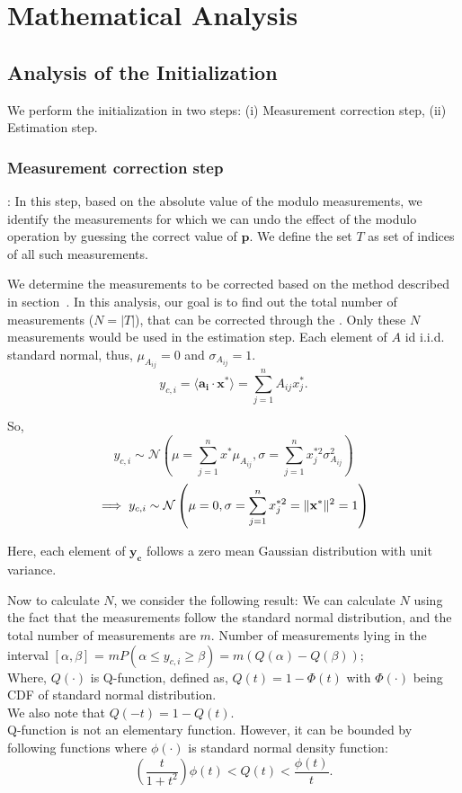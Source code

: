 \newpage

\section{Mathematical Analysis}

\subsection{Analysis of the Initialization}
We perform the initialization in two steps:
(i) Measurement correction step, (ii) Estimation step.

\subsubsection{Measurement correction step}\label{meascorr}: In this step, based on the absolute value of the modulo measurements, we identify the measurements for which we can undo the effect of the modulo operation by guessing the correct value of $\mathbf{p}$. We define the set $T$ as set of indices of all such measurements.

We determine the measurements to be corrected based on the method described in section~{}. 
In this analysis, our goal is to find out the total number of measurements ($N=|T|$), that can be corrected through the . Only these $N$ measurements would be used in the estimation step.
Each element of $A$ id i.i.d. standard normal, thus, $\mu_{A_{ij}} = 0$ and $\sigma_{A_{ij}}=1$.
$$
y_{c,i} =\langle \mathbf{a_i} \cdot \mathbf{x^*} \rangle = \sum_{j=1}^{n}A_{ij}x^*_{j}.
$$

So, 
$$
y_{c,i} \sim \mathcal{N}\left(\mu= \sum_{j=1}^{n}x^{*}\mu_{A_{ij}}, \sigma =\sum_{j=1}^{n}x^{*2}_{j}\sigma^2_{A_{ij}}\right)
$$
$$
\implies y_{c,i} \sim \mathcal{N}\left(\mu= 0, \sigma =\sum_{j=1}^{n}x^{*2}_{j} = \|\mathbf{{x}^*}\|^2 = 1 \right)
$$

Here, each element of $\mathbf{y_c}$ follows a zero mean Gaussian distribution with unit variance.

Now to calculate $N$, we consider the following result:
We can calculate $N$ using the fact that the measurements follow the standard normal distribution, and the total number of measurements are $m$.
Number of measurements lying in the interval $[\alpha,\beta]$ = $mP(\alpha \leq y_{c,i}\geq \beta) = m\left(Q(\alpha)- Q(\beta)\right)$; \\
Where, $Q(\cdot)$ is Q-function, defined as, $Q(t) = 1-\Phi(t)$ with $\Phi(\cdot)$ being CDF of standard normal distribution. \\
We also note that $Q(-t) = 1 - Q(t)$. \\
Q-function is not an elementary function. However, it can be bounded by following functions where $\phi(\cdot)$ is standard normal density function:
$$
\left(\frac{t}{1+t^2}\right)\phi(t) < Q(t) < \frac{\phi(t)}{t}.
$$

